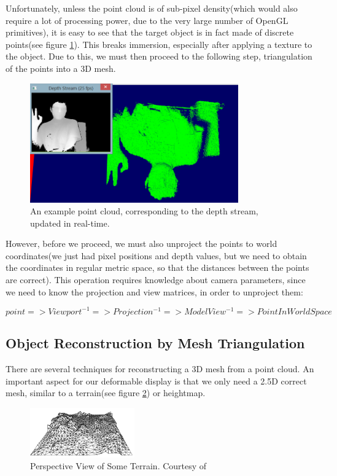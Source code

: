 \documentclass[]{article}
\begin{document}
Unfortunately, unless the point cloud is of sub-pixel density(which would also require a lot of processing power, due to the very large number of OpenGL primitives), it is easy to see that the target object is in fact made of discrete points(see figure \ref{fig:PointCloud}). This breaks immersion, especially after applying a texture to the object. Due to this, we must then proceed to the following step, triangulation of the points into a 3D mesh.

\begin{figure}[hbtp]
    \centering
    \includegraphics[width=0.8\textwidth]{figures/PointCloud.PNG}
    \caption{An example point cloud, corresponding to the depth stream, updated in real-time.}
    \label{fig:PointCloud}
\end{figure}

 However, before we proceed, we must also unproject the points to world coordinates(we just had pixel positions and depth values, but we need to obtain the coordinates in regular metric space, so that the distances between the points are correct). This operation requires knowledge about camera parameters, since we need to know the projection and view matrices, in order to unproject them:

$$point => Viewport^{-1} => Projection^{-1} => ModelView^{-1} => PointInWorldSpace$$



\subsection{Object Reconstruction by Mesh Triangulation}

There are several techniques for reconstructing a 3D mesh from a point cloud. An important aspect for our deformable display is that we only need a 2.5D correct mesh, similar to a terrain(see figure \ref{fig:PerspectiveTerrain}) or heightmap. 

\begin{figure}[hbtp]
    \centering
    \includegraphics[width=0.4\textwidth]{figures/PerspectiveTerrain.PNG}
    \caption{Perspective View of Some Terrain. Courtesy of \cite[Chapter~9]{berg08}}
    \label{fig:PerspectiveTerrain}
\end{figure}
\end{document}
